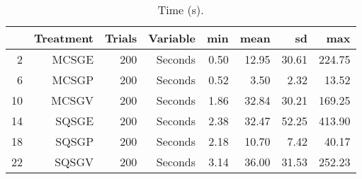 \begin{table}[ht]
\centering
\begin{tabular}{rrrrrrrr}
  \hline
 & Treatment & Trials & Variable & min & mean & sd & max \\ 
  \hline
2 & MCSGE & 200 & Seconds & 0.50 & 12.95 & 30.61 & 224.75 \\ 
  6 & MCSGP & 200 & Seconds & 0.52 & 3.50 & 2.32 & 13.52 \\ 
  10 & MCSGV & 200 & Seconds & 1.86 & 32.84 & 30.21 & 169.25 \\ 
  14 & SQSGE & 200 & Seconds & 2.38 & 32.47 & 52.25 & 413.90 \\ 
  18 & SQSGP & 200 & Seconds & 2.18 & 10.70 & 7.42 & 40.17 \\ 
  22 & SQSGV & 200 & Seconds & 3.14 & 36.00 & 31.53 & 252.23 \\ 
   \hline
\end{tabular}
\caption{Time (s).} 
\end{table}
